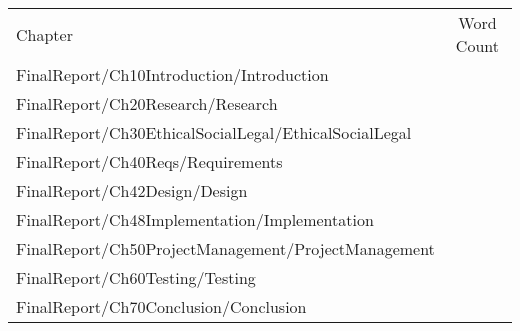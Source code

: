 \documentclass[]{article}
\numberwithin{equation}{section} %
\begin{document}
\newcommand{\chapterwordcount}[1]{#1 & \quickwordcount{#1} \\}

\begin{tabular}{lc}
    Chapter & Word Count \\
    \chapterwordcount{FinalReport/Ch10Introduction/Introduction}
    \chapterwordcount{FinalReport/Ch20Research/Research}
    \chapterwordcount{FinalReport/Ch30EthicalSocialLegal/EthicalSocialLegal}
    \chapterwordcount{FinalReport/Ch40Reqs/Requirements}
    \chapterwordcount{FinalReport/Ch42Design/Design}
    \chapterwordcount{FinalReport/Ch48Implementation/Implementation}
    \chapterwordcount{FinalReport/Ch50ProjectManagement/ProjectManagement}
    \chapterwordcount{FinalReport/Ch60Testing/Testing}
    \chapterwordcount{FinalReport/Ch70Conclusion/Conclusion}
\end{tabular}
\end{document}
